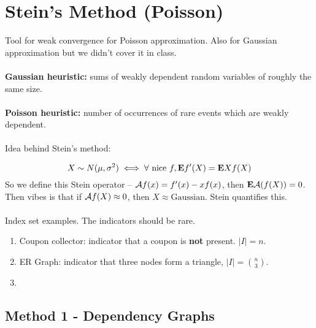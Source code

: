 \documentclass{article}
\begin{document}
\section{Stein's Method (Poisson)}


Tool for weak convergence for Poisson approximation. Also for Gaussian approximation but we didn't cover it in class. \\\\
\textbf{Gaussian heuristic:} sums of weakly dependent random variables of roughly the same size. \\\\
\textbf{Poisson heuristic:} number of occurrences of rare events which are weakly dependent. \\\\
Idea behind Stein's method:

$$X \sim N(\mu,\sigma^2) \iff \forall \text{ nice } f, \mathbf{E} f'(X) = \mathbf{E} X f(X)$$
So we define this Stein operator -- $\mathcal A f(x) = f'(x) - xf(x)$, then $\mathbf{E} \mathcal A (f(X)) = 0$. Then vibes is that if $\mathcal A f(X) \approx 0$, then $X\approx \text{Gaussian}$. Stein quantifies this. \\\\

%
%



Index set examples. The indicators should be rare. 
\begin{enumerate}
	\item Coupon collector: indicator that a coupon is \textbf{not} present. $|I| = n$.
	\item ER Graph: indicator that three nodes form a triangle, $|I| = \binom{n}{3}$.
	\item 
\end{enumerate}



\subsection{Method 1 - Dependency Graphs}
\end{document}
